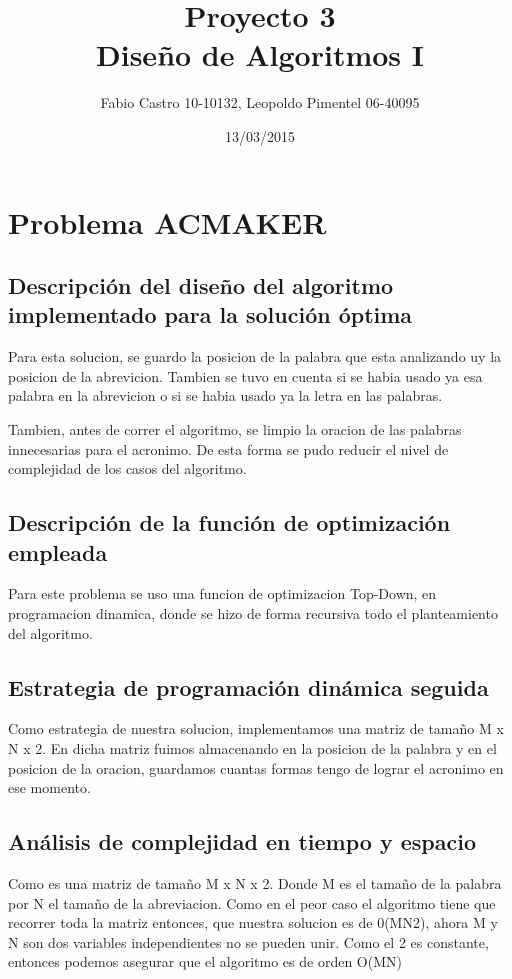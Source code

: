 \documentclass[a4paper,10pt]{article}
\title{}
\author{}
\date{}
\begin{document}
 
\title{\Huge Proyecto 3 \protect\\ Diseño de Algoritmos I}
\author{Fabio Castro 10-10132, Leopoldo Pimentel 06-40095} 
\date{13/03/2015}
\maketitle


\section{Problema ACMAKER}

  \subsection{Descripción del diseño del algoritmo implementado para la solución óptima}
  \hspace{2cm}
    Para esta solucion, se guardo la posicion de la palabra que esta analizando uy la posicion de la abrevicion. Tambien se tuvo en cuenta si se habia usado ya esa palabra en la abrevicion o si se habia usado ya la letra en las palabras. 

Tambien, antes de correr el algoritmo, se limpio la oracion de las palabras innecesarias para el acronimo. De esta forma se pudo reducir el nivel de complejidad de los casos del algoritmo.

  \subsection{Descripción de la función de optimización empleada}
  \hspace{2cm}
    Para este problema se uso una funcion de optimizacion Top-Down, en programacion dinamica, donde se hizo de forma recursiva todo el planteamiento del algoritmo.
    
  \subsection{Estrategia de programación dinámica seguida}
  \hspace{2cm}
    Como estrategia de nuestra solucion, implementamos una matriz de tamaño M x N x 2. En dicha matriz fuimos almacenando en la posicion de la palabra y en el posicion de la oracion, guardamos cuantas formas tengo de lograr el acronimo en ese momento.
  \subsection{Análisis de complejidad en tiempo y espacio}
  \hspace{2cm}
    Como es una matriz de tamaño M x N x 2. Donde M es el tamaño de la palabra por N el tamaño de la abreviacion.
Como en el peor caso el algoritmo tiene que recorrer toda la matriz entonces, que nuestra solucion es de 0(MN2), ahora M y N son dos variables independientes no se pueden unir. Como el 2 es constante, entonces podemos asegurar que el algoritmo es de orden O(MN) 
  
\end{document}

